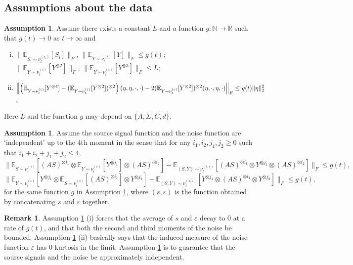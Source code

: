 \documentclass{article} %
\newcommand{\real}{\mathbb{R}}
\renewcommand{\natural}{\mathbb{N}}
\newcommand{\E}{\mathbb{E}}
\renewcommand{\epsilon}{\varepsilon}
\theoremstyle{definition}
\newtheorem{remark}[lemma]{Remark}
\newtheorem{assumption}[lemma]{Assumption}
\begin{document}
\subsection{Assumptions about the data}
\label{subsec:assumptions}
\begin{assumption}
\label{ass:gauss}
Assume there exists a constant $L$ and a function $g:\natural\rightarrow \real$ such that $g(t) \to 0$ as $t \to \infty$ and
\begin{enumerate}[(i)]
\item $\| \E_{S_i\sim \nu_t^{(s_i)}} [S_i] \|_F,\, \| \E_{Y \sim \nu_t^{(\epsilon)}} [Y] \|_F \le g(t)$; $\| \E_{Y\sim \nu_t^{(\epsilon)}} [Y^{\otimes 2}] \|_F,\, \| \E_{Y\sim \nu_t^{(\epsilon)}} [Y^{\otimes 3}] \|_F \le L$;
\item $\Bigl\| \left(\E_{Y\sim \nu_t^{(\epsilon)}} [Y^{\otimes4}] - (\E_{Y\sim \nu_t^{(\epsilon)}} [Y^{\otimes2}])^{\otimes 2}\right)(\eta,\eta,\cdot,\cdot)  - 2 (\E_{Y\sim \nu_t^{(\epsilon)}} [Y^{\otimes2}])^{\otimes 2}(\eta,\cdot,\eta,\cdot)\Bigr\|_F\le g(t)\|\eta\|_2^2$.
\end{enumerate}
Here $L$ and the function $g$ may depend on $\{A,\Sigma,C,d\}$.
\end{assumption}
\begin{assumption}
\label{ass:independence}
Assume the source signal function and the noise function are `independent' up to the 4th moment in the sense that for any $i_1,i_2,j_1,j_2 \ge 0$ such that $i_1+i_2+j_1+j_2 \le 4$,  
\[
 \| \E_{S\sim \nu_t^{(s)}} [(AS)^{\otimes i_1}\!\otimes \E_{Y\sim \nu_t^{(\epsilon)}} [Y^{\otimes j_1}] \!\otimes (AS)^{\otimes i_2}]
- \E_{(S, Y)\sim \nu_t^{(s, \epsilon)}} [(AS)^{\otimes i_1}\!\otimes Y^{\otimes j_1}\!\otimes (AS)^{\otimes i_2}]  \|_F 
 \le g(t),
\]
\[
\| \E_{Y\sim \nu_t^{(\epsilon)}} [Y^{\otimes j_1} \otimes \E_{S\sim \nu_t^{(s)}} [(AS)^{\otimes i_1}] \otimes Y^{\otimes j_2}]- \E_{(S, Y)\sim \nu_t^{(s, \epsilon)}} [ Y^{\otimes j_1}\otimes (AS)^{\otimes i_1}\otimes Y^{\otimes j_2}] \|_F 
\le g(t), %
\]
for the same function $g$ in Assumption \ref{ass:gauss}, where $(s,\epsilon)$ is the function obtained by concatenating $s$ and $\epsilon$ together.  
\end{assumption}
\begin{remark}
Assumption \ref{ass:gauss} (i) forces that the average of $s$ and $\epsilon$ decay to 0 at a rate of $g(t)$,
and that both the second and third moments of the noise be bounded.
Assumption \ref{ass:gauss} (ii) basically says that the induced measure of the noise function $\epsilon$ has 0 kurtosis in the limit.
Assumption \ref{ass:independence} is to guarantee that the source signals and the noise be approximately independent.
\end{remark}
\fi
\end{document}
